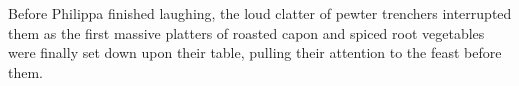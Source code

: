 Before Philippa finished laughing, the loud clatter of pewter trenchers interrupted them as the first massive platters of roasted capon and spiced root vegetables were finally set down upon their table, pulling their attention to the feast before them.

